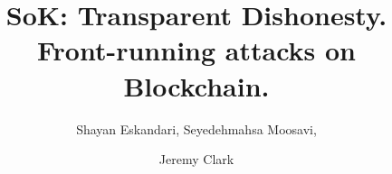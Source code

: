 \documentclass[envcountsect]{llncs}
\begin{document}
\frontmatter
\mainmatter

\title{SoK: Transparent Dishonesty. Front-running attacks on Blockchain. }
\author{Shayan Eskandari, Seyedehmahsa Moosavi, \and Jeremy Clark}

	
\maketitle










\clearpage




\end{document}
